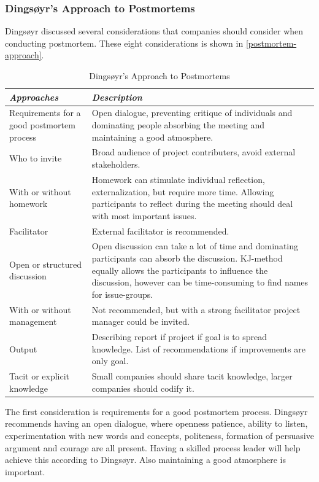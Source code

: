 \subsubsection{Dingsøyr's Approach to Postmortems}
Dingsøyr \cite{Dingsoyr2004} discussed several considerations that companies should consider when conducting postmortem. These eight considerations is shown in \autoref{postmortem-approach}. 

\begin{table}[h]
	\begin{center}
		\caption{Dingsøyr's Approach to Postmortems}
		\label{table:postmortem-approach}
		\begin{tabular}{p{} p{}}
			\hline
			\textit{Approaches} & \textit{Description} \\
			\hline
			Requirements for a good postmortem process & Open dialogue, preventing critique of individuals and dominating people absorbing the meeting and maintaining a good atmosphere. \\
			Who to invite & Broad audience of project contributers, avoid external stakeholders. \\
			With or without homework & Homework can stimulate individual reflection, externalization, but require more time. Allowing participants to reflect during the meeting should deal with most important issues. \\
			Facilitator & External facilitator is recommended. \\
			Open or structured discussion & Open discussion can take a lot of time and dominating participants can absorb the discussion. KJ-method equally allows the participants to influence the discussion, however can be time-consuming to find names for issue-groups. \\
			With or without management & Not recommended, but with a strong facilitator project manager could be invited. \\
			Output & Describing report if project if goal is to spread knowledge. List of recommendations if improvements are only goal. \\
			Tacit or explicit knowledge & Small companies should share tacit knowledge, larger companies should codify it. \\
			\hline
		\end{tabular}
	\end{center}
\end{table}

The first consideration is requirements for a good postmortem process. Dingsøyr recommends having an open dialogue, where openness patience, ability to listen, experimentation with new words and concepts, politeness, formation of persuasive argument and courage are all present. Having a skilled process leader will help achieve this according to Dingsøyr. Also maintaining a good atmosphere is important. 

